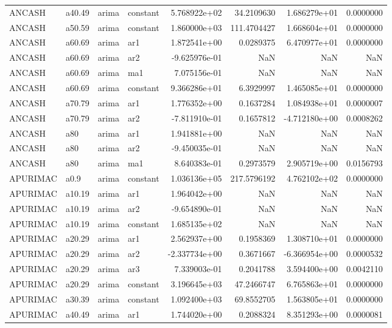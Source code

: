 \documentclass[
]{article}
\begin{document}
\begin{table}[!h]
\begin{tabular}[t]{llllrrrr}
ANCASH & a40.49 & arima & constant & 5.768922e+02 & 34.2109630 & 1.686279e+01 & 0.0000000\\
ANCASH & a50.59 & arima & constant & 1.860000e+03 & 111.4704427 & 1.668604e+01 & 0.0000000\\
ANCASH & a60.69 & arima & ar1 & 1.872541e+00 & 0.0289375 & 6.470977e+01 & 0.0000000\\
\addlinespace
ANCASH & a60.69 & arima & ar2 & -9.625976e-01 & NaN & NaN & NaN\\
ANCASH & a60.69 & arima & ma1 & 7.075156e-01 & NaN & NaN & NaN\\
ANCASH & a60.69 & arima & constant & 9.366286e+01 & 6.3929997 & 1.465085e+01 & 0.0000000\\
ANCASH & a70.79 & arima & ar1 & 1.776352e+00 & 0.1637284 & 1.084938e+01 & 0.0000007\\
ANCASH & a70.79 & arima & ar2 & -7.811910e-01 & 0.1657812 & -4.712180e+00 & 0.0008262\\
\addlinespace
ANCASH & a80 & arima & ar1 & 1.941881e+00 & NaN & NaN & NaN\\
ANCASH & a80 & arima & ar2 & -9.450035e-01 & NaN & NaN & NaN\\
ANCASH & a80 & arima & ma1 & 8.640383e-01 & 0.2973579 & 2.905719e+00 & 0.0156793\\
APURIMAC & a0.9 & arima & constant & 1.036136e+05 & 217.5796192 & 4.762102e+02 & 0.0000000\\
APURIMAC & a10.19 & arima & ar1 & 1.964042e+00 & NaN & NaN & NaN\\
\addlinespace
APURIMAC & a10.19 & arima & ar2 & -9.654890e-01 & NaN & NaN & NaN\\
APURIMAC & a10.19 & arima & constant & 1.685135e+02 & NaN & NaN & NaN\\
APURIMAC & a20.29 & arima & ar1 & 2.562937e+00 & 0.1958369 & 1.308710e+01 & 0.0000000\\
APURIMAC & a20.29 & arima & ar2 & -2.337734e+00 & 0.3671667 & -6.366954e+00 & 0.0000532\\
APURIMAC & a20.29 & arima & ar3 & 7.339003e-01 & 0.2041788 & 3.594400e+00 & 0.0042110\\
\addlinespace
APURIMAC & a20.29 & arima & constant & 3.196645e+03 & 47.2466747 & 6.765863e+01 & 0.0000000\\
APURIMAC & a30.39 & arima & constant & 1.092400e+03 & 69.8552705 & 1.563805e+01 & 0.0000000\\
APURIMAC & a40.49 & arima & ar1 & 1.744020e+00 & 0.2088324 & 8.351293e+00 & 0.0000081\\

\end{tabular}
\end{table}
\end{document}
